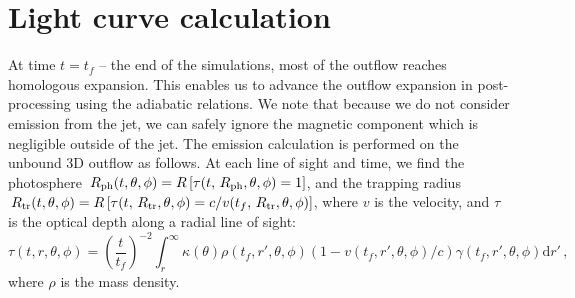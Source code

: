 \documentclass[twocolumn,dvipsnames]{aastex62}
\newcommand{\rph}{\,{R_{\rm ph}}}
\newcommand{\rtr}{\,{R_{\rm tr}}}
\begin{document}


\appendix

\section{Light curve calculation}\label{sec:app}

At time $ t = t_f $ -- the end of the simulations, most of the outflow reaches homologous expansion. This enables us to advance the outflow expansion in post-processing using the adiabatic relations. We note that because we do not consider emission from the jet, we can safely ignore the magnetic component which is negligible outside of the jet. The emission calculation is performed on the unbound 3D outflow as follows.
At each line of sight and time, we find the photosphere $ \rph(t,\theta,\phi)=R\left[\tau(t,\rph,\theta,\phi)=1\right] $, and the trapping radius $ \rtr(t,\theta,\phi)=R\left[\tau(t,\rtr,\theta,\phi)=c/v(t_f,\rtr,\theta,\phi)\right] $, where $ v $ is the velocity, and $ \tau $ is the optical depth along a radial line of sight:
\begin{equation}\label{eq:tau}
    \tau(t,r,\theta,\phi) = \left(\frac{t}{t_f}\right)^{-2}\int_{r}^{\infty}\kappa(\theta)\rho(t_f,r',\theta,\phi)(1-v(t_f,r',\theta,\phi)/c)\gamma(t_f,r',\theta,\phi)\mathrm{d}r'\,,
\end{equation}
where $ \rho $ is the mass density.
\end{document}
